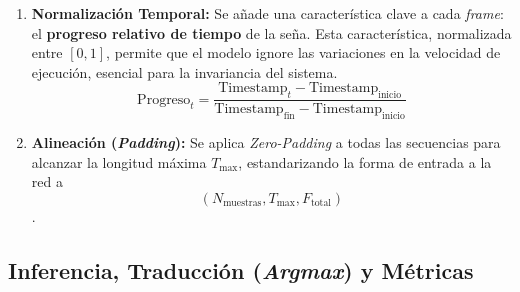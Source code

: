 \begin{enumerate}
    \item \textbf{Normalización Temporal:} Se añade una característica clave a cada \textit{frame}: el \textbf{progreso relativo de tiempo} de la seña. Esta característica, normalizada entre $[0, 1]$, permite que el modelo ignore las variaciones en la velocidad de ejecución, esencial para la invariancia del sistema.
    \begin{equation}
        \text{Progreso}_t = \frac{\text{Timestamp}_t - \text{Timestamp}_{\text{inicio}}}{\text{Timestamp}_{\text{fin}} - \text{Timestamp}_{\text{inicio}}}
    \end{equation}
    \item \textbf{Alineación (\textit{Padding}):} Se aplica \textit{Zero-Padding} a todas las secuencias para alcanzar la longitud máxima $T_{\text{max}}$, estandarizando la forma de entrada a la red a $$(N_{\text{muestras}}, T_{\text{max}}, F_{\text{total}})$$.
\end{enumerate}

\subsection{Inferencia, Traducción (\textit{Argmax}) y Métricas}

